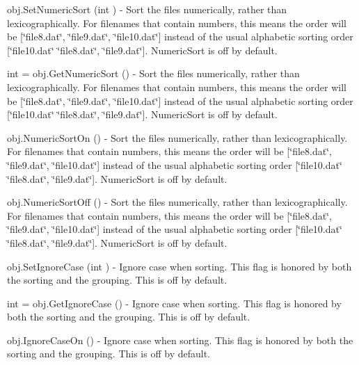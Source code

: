 \begin{DoxyItemize}
\item {\ttfamily obj.\-Set\-Numeric\-Sort (int )} -\/ Sort the files numerically, rather than lexicographically. For filenames that contain numbers, this means the order will be \mbox{[}\char`\"{}file8.\-dat\char`\"{}, \char`\"{}file9.\-dat\char`\"{}, \char`\"{}file10.\-dat\char`\"{}\mbox{]} instead of the usual alphabetic sorting order \mbox{[}\char`\"{}file10.\-dat\char`\"{} \char`\"{}file8.\-dat\char`\"{}, \char`\"{}file9.\-dat\char`\"{}\mbox{]}. Numeric\-Sort is off by default.  
\item {\ttfamily int = obj.\-Get\-Numeric\-Sort ()} -\/ Sort the files numerically, rather than lexicographically. For filenames that contain numbers, this means the order will be \mbox{[}\char`\"{}file8.\-dat\char`\"{}, \char`\"{}file9.\-dat\char`\"{}, \char`\"{}file10.\-dat\char`\"{}\mbox{]} instead of the usual alphabetic sorting order \mbox{[}\char`\"{}file10.\-dat\char`\"{} \char`\"{}file8.\-dat\char`\"{}, \char`\"{}file9.\-dat\char`\"{}\mbox{]}. Numeric\-Sort is off by default.  
\item {\ttfamily obj.\-Numeric\-Sort\-On ()} -\/ Sort the files numerically, rather than lexicographically. For filenames that contain numbers, this means the order will be \mbox{[}\char`\"{}file8.\-dat\char`\"{}, \char`\"{}file9.\-dat\char`\"{}, \char`\"{}file10.\-dat\char`\"{}\mbox{]} instead of the usual alphabetic sorting order \mbox{[}\char`\"{}file10.\-dat\char`\"{} \char`\"{}file8.\-dat\char`\"{}, \char`\"{}file9.\-dat\char`\"{}\mbox{]}. Numeric\-Sort is off by default.  
\item {\ttfamily obj.\-Numeric\-Sort\-Off ()} -\/ Sort the files numerically, rather than lexicographically. For filenames that contain numbers, this means the order will be \mbox{[}\char`\"{}file8.\-dat\char`\"{}, \char`\"{}file9.\-dat\char`\"{}, \char`\"{}file10.\-dat\char`\"{}\mbox{]} instead of the usual alphabetic sorting order \mbox{[}\char`\"{}file10.\-dat\char`\"{} \char`\"{}file8.\-dat\char`\"{}, \char`\"{}file9.\-dat\char`\"{}\mbox{]}. Numeric\-Sort is off by default.  
\item {\ttfamily obj.\-Set\-Ignore\-Case (int )} -\/ Ignore case when sorting. This flag is honored by both the sorting and the grouping. This is off by default.  
\item {\ttfamily int = obj.\-Get\-Ignore\-Case ()} -\/ Ignore case when sorting. This flag is honored by both the sorting and the grouping. This is off by default.  
\item {\ttfamily obj.\-Ignore\-Case\-On ()} -\/ Ignore case when sorting. This flag is honored by both the sorting and the grouping. This is off by default.  

\end{DoxyItemize}
